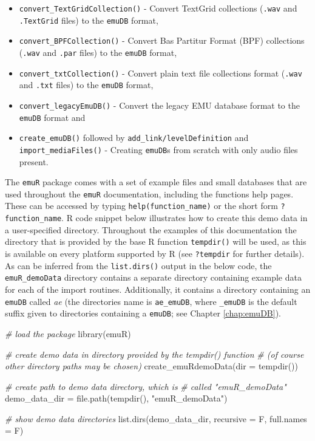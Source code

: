 \documentclass[
]{book}
\newenvironment{Shaded}{\begin{snugshade}}{\end{snugshade}}
\newcommand{\AttributeTok}[1]{\textcolor[rgb]{0.77,0.63,0.00}{#1}}
\newcommand{\CommentTok}[1]{\textcolor[rgb]{0.56,0.35,0.01}{\textit{#1}}}
\newcommand{\FunctionTok}[1]{\textcolor[rgb]{0.00,0.00,0.00}{#1}}
\newcommand{\NormalTok}[1]{#1}
\newcommand{\OtherTok}[1]{\textcolor[rgb]{0.56,0.35,0.01}{#1}}
\newcommand{\StringTok}[1]{\textcolor[rgb]{0.31,0.60,0.02}{#1}}
\providecommand{\tightlist}{%
  \setlength{\itemsep}{0pt}\setlength{\parskip}{0pt}}
\begin{document}
\begin{itemize}
\tightlist
\item
  \texttt{convert\_TextGridCollection()} - Convert TextGrid collections (\texttt{.wav} and \texttt{.TextGrid} files) to the \texttt{emuDB} format,
\item
  \texttt{convert\_BPFCollection()} - Convert Bas Partitur Format (BPF) collections (\texttt{.wav} and \texttt{.par} files) to the \texttt{emuDB} format,
\item
  \texttt{convert\_txtCollection()} - Convert plain text file collections format (\texttt{.wav} and \texttt{.txt} files) to the \texttt{emuDB} format,
\item
  \texttt{convert\_legacyEmuDB()} - Convert the legacy EMU database format to the \texttt{emuDB} format and
\item
  \texttt{create\_emuDB()} followed by \texttt{add\_link/levelDefinition} and \texttt{import\_mediaFiles()} - Creating \texttt{emuDB}s from scratch with only audio files present.
\end{itemize}

The \texttt{emuR} package comes with a set of example files and small databases that are used throughout the \texttt{emuR} documentation, including the functions help pages. These can be accessed by typing \texttt{help(function\_name)} or the short form \texttt{?function\_name}. R code snippet below illustrates how to create this demo data in a user-specified directory. Throughout the examples of this documentation the directory that is provided by the base R function \texttt{tempdir()} will be used, as this is available on every platform supported by R (see \texttt{?tempdir} for further details). As can be inferred from the \texttt{list.dirs()} output in the below code, the \texttt{emuR\_demoData} directory contains a separate directory containing example data for each of the import routines. Additionally, it contains a directory containing an \texttt{emuDB} called \emph{ae} (the directories name is \texttt{ae\_emuDB}, where \texttt{\_emuDB} is the default suffix given to directories containing a \texttt{emuDB}; see Chapter \ref{chap:emuDB}).

\begin{Shaded}
\begin{Highlighting}[]
\CommentTok{\# load the package}
\FunctionTok{library}\NormalTok{(emuR)}

\CommentTok{\# create demo data in directory provided by the tempdir() function}
\CommentTok{\# (of course other directory paths may be chosen)}
\FunctionTok{create\_emuRdemoData}\NormalTok{(}\AttributeTok{dir =} \FunctionTok{tempdir}\NormalTok{())}

\CommentTok{\# create path to demo data directory, which is}
\CommentTok{\# called "emuR\_demoData"}
\NormalTok{demo\_data\_dir }\OtherTok{=} \FunctionTok{file.path}\NormalTok{(}\FunctionTok{tempdir}\NormalTok{(), }\StringTok{"emuR\_demoData"}\NormalTok{)}

\CommentTok{\# show demo data directories}
\FunctionTok{list.dirs}\NormalTok{(demo\_data\_dir, }\AttributeTok{recursive =}\NormalTok{ F, }\AttributeTok{full.names =}\NormalTok{ F)}
\end{Highlighting}
\end{Shaded}
\end{document}
